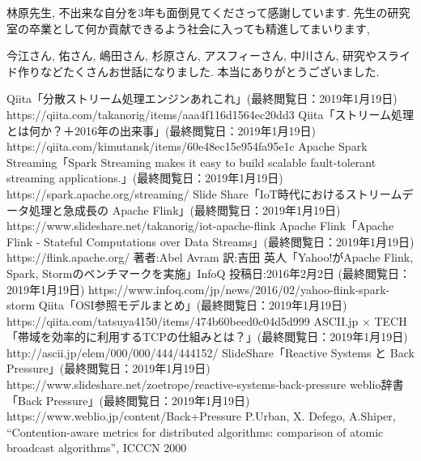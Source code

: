\documentclass[11pt]{jreport}
\begin{document}
 \begin{acknowledgements}
林原先生, 不出来な自分を3年も面倒見てくださって感謝しています. 
先生の研究室の卒業として何か貢献できるよう社会に入っても精進してまいります,

今江さん, 佑さん, 嶋田さん, 杉原さん, アスフィーさん, 中川さん, 研究やスライド作りなどたくさんお世話になりました. 本当にありがとうございました.
 \end{acknowledgements}
%
%
\begin{thebibliography}{99}
Qiita「分散ストリーム処理エンジンあれこれ」(最終閲覧日：2019年1月19日)
https://qiita.com/takanorig/items/aaa4f116d1564ec20dd3
Qiita「ストリーム処理とは何か？＋2016年の出来事」(最終閲覧日：2019年1月19日)
https://qiita.com/kimutansk/items/60e48ec15e954fa95e1c
Apache Spark Streaming「Spark Streaming makes it easy to build scalable fault-tolerant streaming applications.」(最終閲覧日：2019年1月19日)
https://spark.apache.org/streaming/
Slide Share「IoT時代におけるストリームデータ処理と急成長の Apache Flink」(最終閲覧日：2019年1月19日)
https://www.slideshare.net/takanorig/iot-apache-flink
Apache Flink「Apache Flink - Stateful Computations over Data Streams」(最終閲覧日：2019年1月19日)
https://flink.apache.org/
著者:Abel Avram 訳:吉田 英人「Yahoo!がApache Flink, Spark, Stormのベンチマークを実施」InfoQ 投稿日:2016年2月2日 (最終閲覧日：2019年1月19日)
https://www.infoq.com/jp/news/2016/02/yahoo-flink-spark-storm
Qiita「OSI参照モデルまとめ」(最終閲覧日：2019年1月19日)
https://qiita.com/tatsuya4150/items/474b60beed0c04d5d999
ASCII.jp × TECH「帯域を効率的に利用するTCPの仕組みとは？」(最終閲覧日：2019年1月19日)
http://ascii.jp/elem/000/000/444/444152/
SlideShare「Reactive Systems と Back Pressure」(最終閲覧日：2019年1月19日)
https://www.slideshare.net/zoetrope/reactive-systems-back-pressure
weblio辞書「Back Pressure」(最終閲覧日：2019年1月19日)
https://www.weblio.jp/content/Back+Pressure
P.Urban, X. Defego, A.Shiper, “Contention-aware metrics for distributed algorithms: comparison of atomic broadcast algorithms”, ICCCN 2000

\end{thebibliography}
%
%
\appendix
\end{document}
